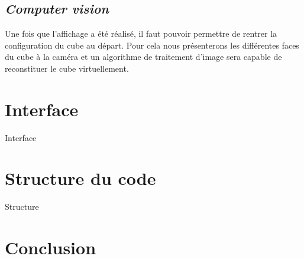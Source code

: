 \documentclass[a4paper]{report}
\begin{document}
\section{\textit{Computer vision}}
Une fois que l'affichage a été réalisé, il faut pouvoir permettre de rentrer la configuration du cube au départ. Pour cela nous présenterons les différentes faces du cube à la caméra et un algorithme de traitement d'image sera capable de reconstituer le cube virtuellement.

\chapter{Interface}
Interface

\chapter{Structure du code}
Structure

\chapter*{Conclusion}
\end{document}
